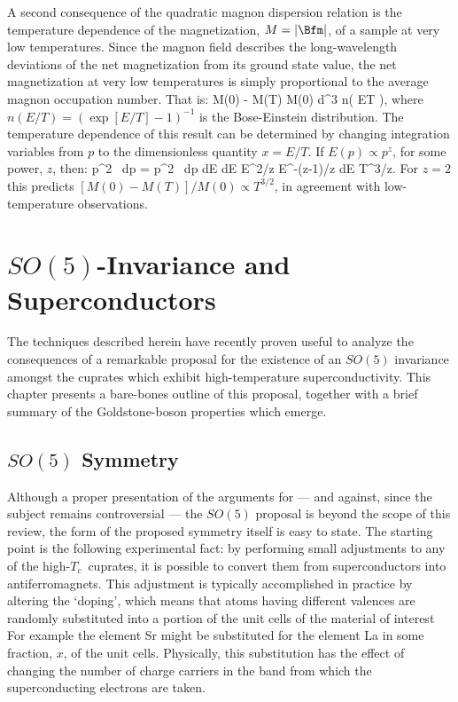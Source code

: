 \documentclass[12pt,epsf]{report}
\def\Tc{$T_c$}
\begin{document}
A second consequence of the quadratic magnon dispersion
relation is the temperature dependence of the
magnetization, $M = |\Bfm|$, of a sample at very low
temperatures. Since the magnon field describes the
long-wavelength deviations of the net magnetization from
its ground state value, the net magnetization at very low
temperatures is simply proportional to the average magnon
occupation number. That is:
%
\eq
\label{lowtmagnetization}
M(0) - M(T)  \propto M(0) \; \int 
d^3\bfp \; n\left( {E\over T} \right),
\eeq
%
where $n(E/T) = (\exp[E/T] - 1)^{-1}$ is the Bose-Einstein
distribution. The temperature dependence of this result can
be determined by changing integration variables from $p$ to
the dimensionless quantity $x = E/T$. If $E(p) \propto
p^z$, for some power, $z$, then:
%
\eq
\label{scalinglaws}
p^2 \, dp = p^2 \, {dp \over dE} \; 
dE \propto E^{2/z} \; E^{-(z-1)/z} \; dE
\propto T^{3/z}.
\eeq
%
For $z = 2$ this predicts $[M(0) - M(T)]/M(0) \propto
T^{3/2}$, in agreement with low-temperature observations.

\chapter{$SO(5)$-Invariance and Superconductors}

The techniques described herein have recently proven useful
to analyze the consequences of a remarkable  proposal for
the existence of an $SO(5)$ invariance  amongst the
cuprates which exhibit high-temperature superconductivity.
This chapter presents a bare-bones outline of this
proposal, together with a brief summary of the
Goldstone-boson properties which emerge.

\section{$SO(5)$ Symmetry}

Although a proper presentation of the arguments  for ---
and against, since the subject remains controversial ---
the $SO(5)$ proposal is beyond the scope of this review, 
the form of the proposed symmetry itself is easy
to state. The starting point is the following experimental
fact: by performing small adjustments to any of the
high-\Tc\ cuprates, it is possible to convert them from
superconductors into antiferromagnets. This adjustment
is typically accomplished in practice
by altering the `doping', which means that
atoms having different valences are randomly substituted 
into a portion of the unit cells of the material of interest
For example the element Sr might be substituted
for the element La in some fraction, $x$, of the unit cells. 
Physically, this substitution
has the effect of changing the number of charge carriers 
in the band from which  the
superconducting electrons are taken. 
\end{document}
